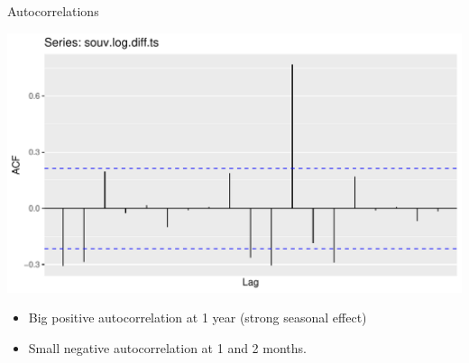 \documentclass[ignorenonframetext,]{beamer}
\newenvironment{Shaded}{\begin{snugshade}}{\end{snugshade}}
\newcommand{\DataTypeTok}[1]{\textcolor[rgb]{0.13,0.29,0.53}{#1}}
\newcommand{\KeywordTok}[1]{\textcolor[rgb]{0.13,0.29,0.53}{\textbf{#1}}}
\newcommand{\NormalTok}[1]{#1}
\newcommand{\OperatorTok}[1]{\textcolor[rgb]{0.81,0.36,0.00}{\textbf{#1}}}
\newcommand{\StringTok}[1]{\textcolor[rgb]{0.31,0.60,0.02}{#1}}
\providecommand{\tightlist}{%
  \setlength{\itemsep}{0pt}\setlength{\parskip}{0pt}}
\begin{document}
\begin{frame}[fragile]{Autocorrelations}
\protect\hypertarget{autocorrelations}{}

\begin{Shaded}
\end{Shaded}

\includegraphics{figure/unnamed-chunk-598-1.pdf}

\begin{itemize}
\tightlist
\item
  Big positive autocorrelation at 1 year (strong seasonal effect)
\item
  Small negative autocorrelation at 1 and 2 months.
\end{itemize}

\end{frame}
\end{document}
